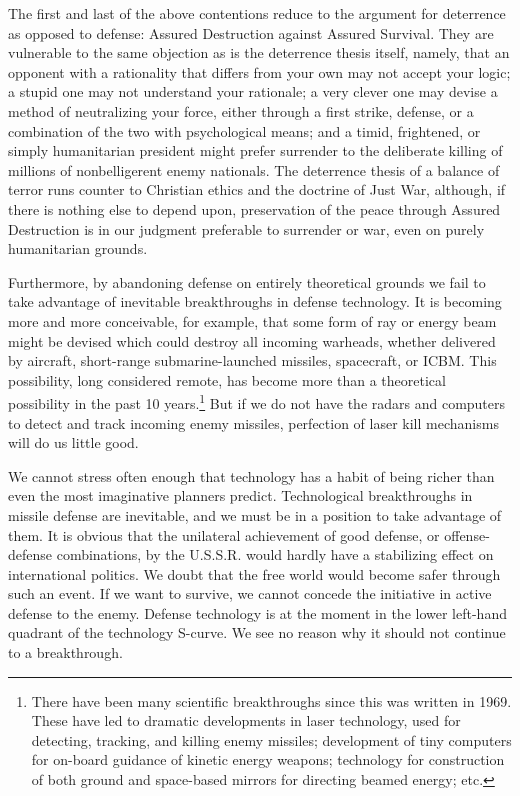 The first and last of the above contentions reduce to the argument for deterrence as opposed to defense: Assured Destruction against Assured Survival. They are vulnerable to the same objection as is the deterrence thesis itself, namely, that an opponent with a rationality that differs from your own may not accept your logic; a stupid one may not understand your rationale; a very clever one may devise a method of neutralizing your force, either through a first strike, defense, or a combination of the two with psychological means; and a timid, frightened, or simply humanitarian president might prefer surrender to the deliberate killing of millions of nonbelligerent enemy nationals. The deterrence thesis of a balance of terror runs counter to Christian ethics and the doctrine of Just War, although, if there is nothing else to depend upon, preservation of the peace through Assured Destruction is in our judgment preferable to surrender or war, even on purely humanitarian grounds.

Furthermore, by abandoning defense on entirely theoretical grounds we fail to take advantage of inevitable breakthroughs in defense technology. It is becoming more and more conceivable, for example, that some form of ray or energy beam might be devised which could destroy all incoming warheads, whether delivered by aircraft, short-range submarine-launched missiles, spacecraft, or ICBM. This possibility, long considered remote, has become more than a theoretical possibility in the past 10 years.\footnote{There have been many scientific breakthroughs since this was written in 1969. These have led to dramatic developments in laser technology, used for detecting, tracking, and killing enemy missiles; development of tiny computers for on-board guidance of kinetic energy weapons; technology for construction of both ground and space-based mirrors for directing beamed energy; etc.} But if we do not have the radars and computers to detect and track incoming enemy missiles, perfection of laser kill mechanisms will do us little good.

We cannot stress often enough that technology has a habit of being richer than even the most imaginative planners predict. Technological breakthroughs in missile defense are inevitable, and we must be in a position to take advantage of them. It is obvious that the unilateral achievement of good defense, or offense-defense combinations, by the U.S.S.R. would hardly have a stabilizing effect on international politics. We doubt that the free world would become safer through such an event. If we want to survive, we cannot concede the initiative in active defense to the enemy. Defense technology is at the moment in the lower left-hand quadrant of the technology S-curve. We see no reason why it should not continue to a breakthrough.

